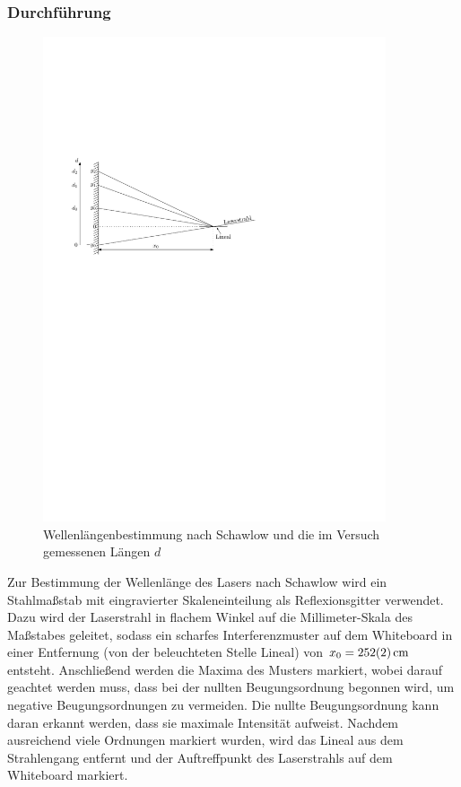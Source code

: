 \documentclass[11pt, a4paper]{article}
\numberwithin{equation}{section}
\begin{document}
\subsubsection{Durchführung}
\begin{figure}[h]
	\centering
	\includegraphics[width=0.9\textwidth]{./figures/wellenlaenge_lineal.pdf}
	\caption{Wellenlängenbestimmung nach Schawlow \cite{schawlow} und die im Versuch gemessenen Längen $d$}
	\label{fig:schawlow}
\end{figure}
Zur Bestimmung der Wellenlänge des Lasers nach Schawlow \cite{schawlow} wird ein Stahlmaßstab mit eingravierter Skaleneinteilung als Reflexionsgitter verwendet.
Dazu wird der Laserstrahl in flachem Winkel auf die Millimeter-Skala des Maßstabes geleitet, sodass ein scharfes Interferenzmuster auf dem Whiteboard in einer Entfernung (von der beleuchteten Stelle Lineal) von $x_0 = \SI{252 +- 2}{\centi\metre}$ entsteht.
Anschließend werden die Maxima des Musters markiert, wobei darauf geachtet werden muss, dass bei der nullten Beugungsordnung begonnen wird, um negative Beugungsordnungen zu vermeiden.
Die nullte Beugungsordnung kann daran erkannt werden, dass sie maximale Intensität aufweist.
Nachdem ausreichend viele Ordnungen markiert wurden, wird das Lineal aus dem Strahlengang entfernt und der Auftreffpunkt des Laserstrahls auf dem Whiteboard markiert.
\end{document}
